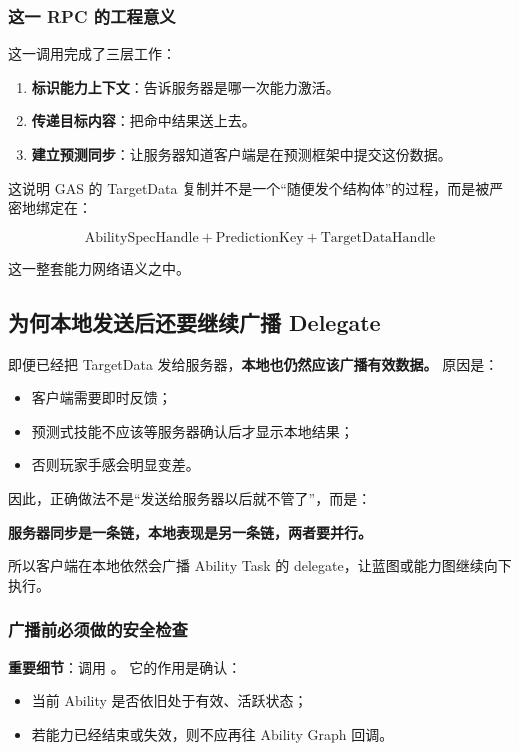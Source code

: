 \documentclass[10pt,CJKmath]{ctexart}
\begin{document}
\subsubsection{这一 RPC 的工程意义}

这一调用完成了三层工作：

\begin{enumerate}
	\item \textbf{标识能力上下文}：告诉服务器是哪一次能力激活。
	\item \textbf{传递目标内容}：把命中结果送上去。
	\item \textbf{建立预测同步}：让服务器知道客户端是在预测框架中提交这份数据。
\end{enumerate}

这说明 GAS 的 TargetData 复制并不是一个“随便发个结构体”的过程，而是被严密地绑定在：

\[
\text{AbilitySpecHandle} + \text{PredictionKey} + \text{TargetDataHandle}
\]

这一整套能力网络语义之中。

\subsection{为何本地发送后还要继续广播 Delegate}

即便已经把 TargetData 发给服务器，\textbf{本地也仍然应该广播有效数据。}
原因是：

\begin{itemize}
	\item 客户端需要即时反馈；
	\item 预测式技能不应该等服务器确认后才显示本地结果；
	\item 否则玩家手感会明显变差。
\end{itemize}

因此，正确做法不是“发送给服务器以后就不管了”，而是：

\begin{center}
	\textbf{服务器同步是一条链，本地表现是另一条链，两者要并行。}
\end{center}

所以客户端在本地依然会广播 Ability Task 的 delegate，让蓝图或能力图继续向下执行。

\subsubsection{广播前必须做的安全检查}

\textbf{重要细节}：调用
。
它的作用是确认：
\begin{itemize}
	\item 当前 Ability 是否依旧处于有效、活跃状态；
	\item 若能力已经结束或失效，则不应再往 Ability Graph 回调。
\end{itemize}
\end{document}
